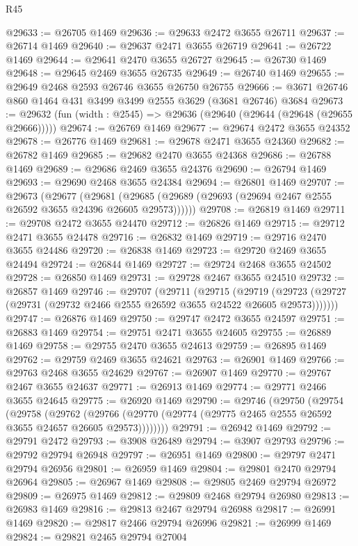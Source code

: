 \begin{lexlean}{R45}
\begin{coremodule}
@29633 := @26705 @1469
@29636 := @29633 @2472 @3655 @26711
@29637 := @26714 @1469
@29640 := @29637 @2471 @3655 @26719
@29641 := @26722 @1469
@29644 := @29641 @2470 @3655 @26727
@29645 := @26730 @1469
@29648 := @29645 @2469 @3655 @26735
@29649 := @26740 @1469
@29655 := @29649 @2468 @2593 @26746 @3655 @26750 @26755
@29666 := @3671 @26746 @860 @1464 @431 @3499 @3499 @2555 @3629 (@3681 @26746) @3684
@29673 := @29632 (fun (width : @2545) => @29636 (@29640 (@29644 (@29648 (@29655 @29666)))))
@29674 := @26769 @1469
@29677 := @29674 @2472 @3655 @24352
@29678 := @26776 @1469
@29681 := @29678 @2471 @3655 @24360
@29682 := @26782 @1469
@29685 := @29682 @2470 @3655 @24368
@29686 := @26788 @1469
@29689 := @29686 @2469 @3655 @24376
@29690 := @26794 @1469
@29693 := @29690 @2468 @3655 @24384
@29694 := @26801 @1469
@29707 := @29673
    (@29677
      (@29681 (@29685 (@29689 (@29693 (@29694 @2467 @2555 @26592 @3655 @24396 @26605 @29573))))))
@29708 := @26819 @1469
@29711 := @29708 @2472 @3655 @24470
@29712 := @26826 @1469
@29715 := @29712 @2471 @3655 @24478
@29716 := @26832 @1469
@29719 := @29716 @2470 @3655 @24486
@29720 := @26838 @1469
@29723 := @29720 @2469 @3655 @24494
@29724 := @26844 @1469
@29727 := @29724 @2468 @3655 @24502
@29728 := @26850 @1469
@29731 := @29728 @2467 @3655 @24510
@29732 := @26857 @1469
@29746 := @29707
    (@29711
      (@29715
        (@29719 (@29723 (@29727 (@29731 (@29732 @2466 @2555 @26592 @3655 @24522 @26605 @29573)))))))
@29747 := @26876 @1469
@29750 := @29747 @2472 @3655 @24597
@29751 := @26883 @1469
@29754 := @29751 @2471 @3655 @24605
@29755 := @26889 @1469
@29758 := @29755 @2470 @3655 @24613
@29759 := @26895 @1469
@29762 := @29759 @2469 @3655 @24621
@29763 := @26901 @1469
@29766 := @29763 @2468 @3655 @24629
@29767 := @26907 @1469
@29770 := @29767 @2467 @3655 @24637
@29771 := @26913 @1469
@29774 := @29771 @2466 @3655 @24645
@29775 := @26920 @1469
@29790 := @29746
    (@29750
      (@29754
        (@29758
          (@29762
            (@29766 (@29770 (@29774 (@29775 @2465 @2555 @26592 @3655 @24657 @26605 @29573))))))))
@29791 := @26942 @1469
@29792 := @29791 @2472
@29793 := @3908 @26489
@29794 := @3907 @29793
@29796 := @29792 @29794 @26948
@29797 := @26951 @1469
@29800 := @29797 @2471 @29794 @26956
@29801 := @26959 @1469
@29804 := @29801 @2470 @29794 @26964
@29805 := @26967 @1469
@29808 := @29805 @2469 @29794 @26972
@29809 := @26975 @1469
@29812 := @29809 @2468 @29794 @26980
@29813 := @26983 @1469
@29816 := @29813 @2467 @29794 @26988
@29817 := @26991 @1469
@29820 := @29817 @2466 @29794 @26996
@29821 := @26999 @1469
@29824 := @29821 @2465 @29794 @27004

\end{coremodule}
\end{lexlean}
